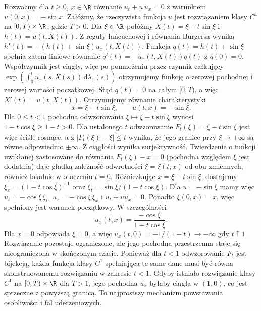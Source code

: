 \begin{przyklad}
\label{ex:burgers-blowup}
Rozważmy dla $t\geq0$, $x\in\R$ równanie
$u_t+u\,u_x=0$ z warunkiem $u(0,x)=-\sin x$.
Załóżmy, że rzeczywista funkcja $u$ jest rozwiązaniem klasy $C^1$ na
$[0,T)\times\R$, gdzie $T>0$. Dla $\xi\in\R$ połóżmy
$X(t)=\xi-t\sin\xi$ i $h(t)=u(t,X(t))$.
Z reguły łańcuchowej i równania Burgersa wynika
$h'(t)=-(h(t)+\sin\xi)u_x(t,X(t))$.
Funkcja $q(t)=h(t)+\sin\xi$ spełnia zatem liniowe równanie
$q'(t)=-u_x(t,X(t))q(t)$ z $q(0)=0$.
Współczynnik jest ciągły, więc po pomnożeniu przez czynnik
całkujący $\exp(\int_0^t u_x(s,X(s))\,\mathrm d\lambda_1(s))$
otrzymujemy funkcję o zerowej pochodnej i zerowej wartości
początkowej. Stąd $q(t)=0$ na całym $[0,T)$, a więc
$X'(t)=u(t,X(t))$. Otrzymujemy równanie charakterystyki
\begin{equation}\label{eq:burgers-characteristics}
 x=\xi-t\sin\xi,\qquad u(t,x)=-\sin\xi.
\end{equation}
Dla $0\leq t<1$ pochodna odwzorowania
$\xi\mapsto\xi-t\sin\xi$ wynosi $1-t\cos\xi\geq1-t>0$.
Dla ustalonego $t$ odwzorowanie $F_t(\xi)=\xi-t\sin\xi$
jest więc ściśle rosnące, a z $|F_t(\xi)-\xi|\leq t$
wynika, że jego granice przy $\xi\to\pm\infty$ są równe
odpowiednio $\pm\infty$. Z ciągłości wynika surjektywność.
Twierdzenie o funkcji uwikłanej zastosowane do równania
$F_t(\xi)-x=0$ (pochodna względem $\xi$ jest dodatnia)
daje gładką zależność odwrotności $\xi=\xi(t,x)$ od obu zmiennych,
również lokalnie w otoczeniu $t=0$.
Różniczkując $x=\xi-t\sin\xi$, dostajemy
$\xi_x=(1-t\cos\xi)^{-1}$ oraz
$\xi_t=\sin\xi/(1-t\cos\xi)$.
Dla $u=-\sin\xi$ mamy więc $u_t=-\cos\xi\,\xi_t$,
$u_x=-\cos\xi\,\xi_x$ i $u_t+uu_x=0$.
Ponadto $\xi(0,x)=x$, więc spełniony jest warunek początkowy.
W szczególności
\begin{equation}\label{eq:burgers-gradient}
 u_x(t,x)=\frac{-\cos\xi}{1-t\cos\xi}.
\end{equation}
Dla $x=0$ odpowiada $\xi=0$, a więc
$u_x(t,0)=-1/(1-t)\to-\infty$ gdy $t\uparrow1$.
Rozwiązanie pozostaje ograniczone, ale jego pochodna
przestrzenna staje się nieograniczona w skończonym czasie.
Ponieważ dla $t<1$ odwzorowanie $F_t$ jest bijekcją, każda
funkcja klasy $C^1$ spełniająca te same dane musi być równa
skonstruowanemu rozwiązaniu w zakresie $t<1$. Gdyby istniało
rozwiązanie klasy $C^1$ na $[0,T)\times\R$ dla $T>1$,
jego pochodna $u_x$ byłaby ciągła w $(1,0)$, co jest
sprzeczne z powyższą granicą.
To najprostszy mechanizm powstawania osobliwości i
fal uderzeniowych.
\end{przyklad}


